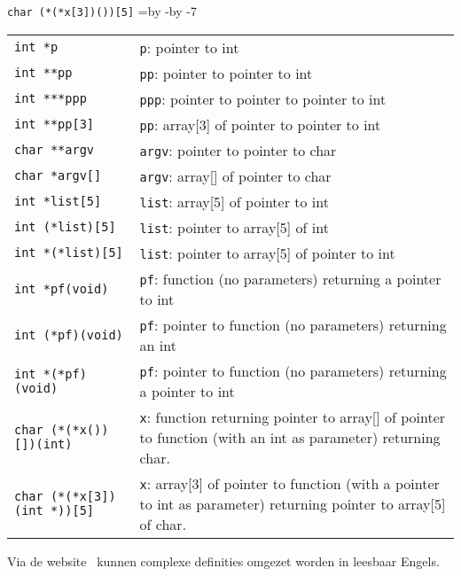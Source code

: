 \hbox{\texttt{char (*(*x[3])())[5]}}
\newdimen\delengte\delengte=\textwidth\advance\delengte by -\advance\delengte by -7\tabcolsep
\begin{table}[!ht]
\begin{tabular}{@{}lp{\delengte}@{}}
\texttt{int *p} & \texttt{p}: pointer to int\\
\texttt{int **pp} & \texttt{pp}: pointer to pointer to int \\
\texttt{int ***ppp} & \texttt{ppp}: pointer to pointer to pointer to int \\
\texttt{int **pp[3]} & \texttt{pp}: array[3] of pointer to pointer to int \\
\texttt{char **argv} & \texttt{argv}: pointer to pointer to char \\
\texttt{char *argv[]} &\texttt{argv}: array[] of pointer to char \\
\texttt{int *list[5]} & \texttt{list}: array[5] of pointer to int \\
\texttt{int (*list)[5]} & \texttt{list}: pointer to array[5] of int \\
\texttt{int *(*list)[5]} & \texttt{list}: pointer to array[5] of pointer to int \\
\texttt{int *pf(void)} & \texttt{pf}: function (no parameters) returning a pointer to int \\
\texttt{int (*pf)(void)} & \texttt{pf}: pointer to function (no parameters) returning an int \\
\texttt{int *(*pf)(void)} & \texttt{pf}: pointer to function (no parameters) returning a pointer to int \\
\texttt{char (*(*x())[])(int)} & \texttt{x}: function returning pointer to array[] of pointer to function (with an int as parameter) returning char.\\
\texttt{char (*(*x[3])(int *))[5]} & \texttt{x}: array[3] of pointer to function (with a pointer to int as parameter) returning pointer to array[5] of char.\\
\end{tabular}
\end{table}

Via de website~\cite{cdeclwebsite} kunnen complexe definities omgezet worden in leesbaar Engels.



